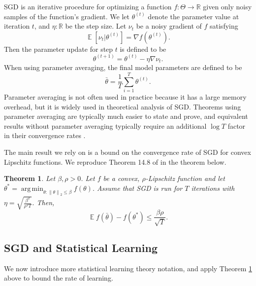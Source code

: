 \documentclass[twoside]{article}
\newtheorem{theorem}{Theorem}
\DeclareMathOperator{\E}{\mathbb E}
\DeclareMathOperator*{\argmin}{arg\,min}
\renewcommand{\star}[1]{{#1}^{*}}
\newcommand{\ltwo}[1]{{\lVert {#1} \rVert}_2}
\begin{document}
{SGD is an iterative procedure for optimizing a function $f : \Theta \to \mathbb R$ given only noisy samples of the function's gradient.
We let $\theta^{(t)}$ denote the parameter value at iteration $t$,
and $\eta : \mathbb R$ be the step size.
Let $\nu_t$ be a noisy gradient of $f$ satisfying
\begin{equation}
    \E[\nu_t | \theta^{(t)}] = \nabla f(\theta^{(t)}).
\end{equation}
Then the parameter update for step $t$ is defined to be
\begin{equation}
    \theta^{(t+1)} = \theta^{(t)} - \eta \nabla \nu_t
    .
\end{equation}
When using parameter averaging, the final model parameters are defined to be
\begin{equation}
    \bar\theta = \frac1T \sum_{i=1}^T \theta^{(t)}
    .
\end{equation}
Parameter averaging is not often used in practice because it has a large memory overhead,
but it is widely used in theoretical analysis of SGD.
Theorems using parameter averaging are typically much easier to state and prove,
and equivalent results without parameter averaging typically require an additional $\log T$ factor in their convergence rates \citep{rakhlin2011making}.

The main result we rely on is a bound on the convergence rate of SGD for convex Lipschitz functions.
We reproduce Theorem 14.8 of \citet{shalev2014understanding} in the theorem below.

\begin{theorem}
    \label{thm:sgd}
    Let $\beta,\rho>0$.
    Let $f$ be a convex, $\rho$-Lipschitz function and let $\star \theta = \argmin_{\theta : \ltwo{\theta}\le \beta} f(\theta)$.
    Assume that SGD is run for $T$ iterations with $\eta = \sqrt{\frac{\beta^2}{\rho^2 T}}$.
    Then,
    \begin{equation}
        \E f(\bar \theta) - f(\star \theta) \le \frac{\beta\rho}{\sqrt{T}}
        .
    \end{equation}
\end{theorem}

\subsection{SGD and Statistical Learning}

We now introduce more statistical learning theory notation,
and apply Theorem \ref{thm:sgd} above to bound the rate of learning.

}
\end{document}
